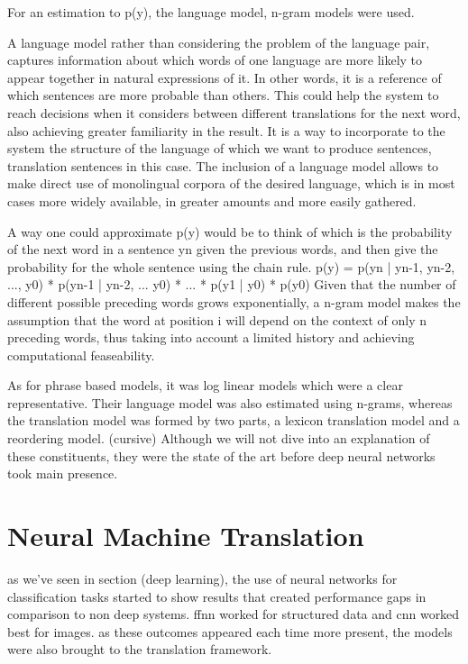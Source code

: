\documentclass[11pt,english,listoffigures,listoftables]{tfgetsinf}
\begin{document}
For an estimation to p(y), the language model, n-gram models were used. 

A language model rather than considering the problem of the language pair, captures information about which words of one language are more likely to appear together in natural expressions of it. In other words, it is a reference of which sentences are more probable than others. 
This could help the system to reach decisions when it considers between different translations for the next word, also achieving greater familiarity in the result.
It is a way to incorporate to the system the structure of the language of which we want to produce sentences,  translation sentences in this case. 
The inclusion of a language model allows to make direct use of monolingual corpora of the desired language, which is in most cases more widely available, in greater amounts and more easily gathered.

A way one could approximate p(y) would be to think of which is the probability of the next word in a sentence yn given the previous words, and then give the probability for the whole sentence using the chain rule.
p(y) = p(yn | yn-1, yn-2, ..., y0) * p(yn-1 | yn-2, ... y0) * ... * p(y1 | y0) * p(y0) 
Given that the number of different possible preceding words grows exponentially, a n-gram model makes the assumption that the word at position i will depend on the context of only n preceding words, thus taking into account a limited history and achieving computational feaseability.

As for phrase based models, it was log linear models which were a clear representative. 
Their language model was also estimated using n-grams, whereas the translation model was formed by two parts, a lexicon translation model and a reordering model. (cursive)
Although we will not dive into an explanation of these constituents, they were the state of the art before deep neural networks took main presence.

\section{Neural Machine Translation}

as we've seen in section (deep learning), the use of neural networks for classification tasks started to show results that created performance gaps in comparison to non deep systems. ffnn worked for structured data and cnn worked best for images. as these outcomes appeared each time more present, the models were also brought to the translation framework. 
\end{document}
